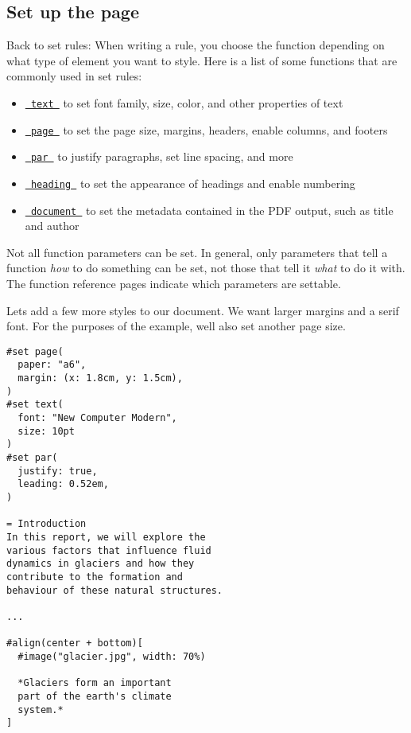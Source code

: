 
\subsection{Set up the page}\label{page-setup}

Back to set rules: When writing a rule, you choose the function
depending on what type of element you want to style. Here is a list of
some functions that are commonly used in set rules:

\begin{itemize}
\tightlist
\item
  \href{/docs/reference/text/text/}{\texttt{\ text\ }} to set font
  family, size, color, and other properties of text
\item
  \href{/docs/reference/layout/page/}{\texttt{\ page\ }} to set the page
  size, margins, headers, enable columns, and footers
\item
  \href{/docs/reference/model/par/}{\texttt{\ par\ }} to justify
  paragraphs, set line spacing, and more
\item
  \href{/docs/reference/model/heading/}{\texttt{\ heading\ }} to set the
  appearance of headings and enable numbering
\item
  \href{/docs/reference/model/document/}{\texttt{\ document\ }} to set
  the metadata contained in the PDF output, such as title and author
\end{itemize}

Not all function parameters can be set. In general, only parameters that
tell a function \emph{how} to do something can be set, not those that
tell it \emph{what} to do it with. The function reference pages indicate
which parameters are settable.

Let\textquotesingle s add a few more styles to our document. We want
larger margins and a serif font. For the purposes of the example,
we\textquotesingle ll also set another page size.

\begin{verbatim}
#set page(
  paper: "a6",
  margin: (x: 1.8cm, y: 1.5cm),
)
#set text(
  font: "New Computer Modern",
  size: 10pt
)
#set par(
  justify: true,
  leading: 0.52em,
)

= Introduction
In this report, we will explore the
various factors that influence fluid
dynamics in glaciers and how they
contribute to the formation and
behaviour of these natural structures.

...

#align(center + bottom)[
  #image("glacier.jpg", width: 70%)

  *Glaciers form an important
  part of the earth's climate
  system.*
]
\end{verbatim}

